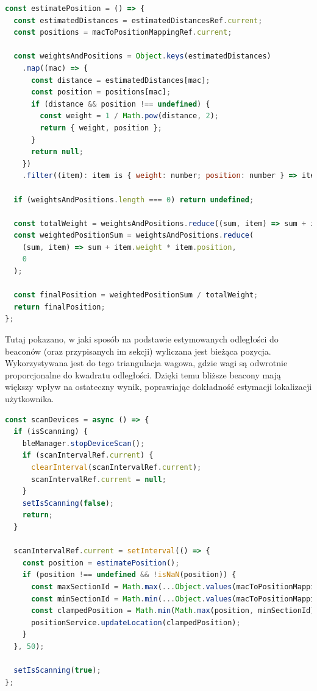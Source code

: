 \begin{lstlisting}[language=JavaScript, caption={Obliczanie pozycji na podstawie odległości do wielu beaconów}, label={lst:useBluetooth_position}]
const estimatePosition = () => {
  const estimatedDistances = estimatedDistancesRef.current;
  const positions = macToPositionMappingRef.current;

  const weightsAndPositions = Object.keys(estimatedDistances)
    .map((mac) => {
      const distance = estimatedDistances[mac];
      const position = positions[mac];
      if (distance && position !== undefined) {
        const weight = 1 / Math.pow(distance, 2);
        return { weight, position };
      }
      return null;
    })
    .filter((item): item is { weight: number; position: number } => item !== null);

  if (weightsAndPositions.length === 0) return undefined;

  const totalWeight = weightsAndPositions.reduce((sum, item) => sum + item.weight, 0);
  const weightedPositionSum = weightsAndPositions.reduce(
    (sum, item) => sum + item.weight * item.position,
    0
  );

  const finalPosition = weightedPositionSum / totalWeight;
  return finalPosition;
};
\end{lstlisting}

Tutaj pokazano, w jaki sposób na podstawie estymowanych odległości do beaconów (oraz przypisanych im sekcji) wyliczana jest bieżąca pozycja. Wykorzystywana jest do tego triangulacja wagowa, gdzie wagi są odwrotnie proporcjonalne do kwadratu odległości. Dzięki temu bliższe beacony mają większy wpływ na ostateczny wynik, poprawiając dokładność estymacji lokalizacji użytkownika.

\begin{lstlisting}[language=JavaScript, caption={Inicjalizacja i zatrzymywanie skanowania urządzeń oraz aktualizacja pozycji}, label={lst:useBluetooth_scan}]
const scanDevices = async () => {
  if (isScanning) {
    bleManager.stopDeviceScan();
    if (scanIntervalRef.current) {
      clearInterval(scanIntervalRef.current);
      scanIntervalRef.current = null;
    }
    setIsScanning(false);
    return;
  }

  scanIntervalRef.current = setInterval(() => {
    const position = estimatePosition();
    if (position !== undefined && !isNaN(position)) {
      const maxSectionId = Math.max(...Object.values(macToPositionMappingRef.current));
      const minSectionId = Math.min(...Object.values(macToPositionMappingRef.current));
      const clampedPosition = Math.min(Math.max(position, minSectionId), maxSectionId);
      positionService.updateLocation(clampedPosition);
    }
  }, 50);

  setIsScanning(true);
};
\end{lstlisting}

